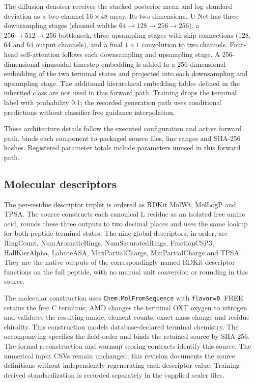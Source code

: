 \documentclass[11pt,a4paper]{article}
\begin{document}
The diffusion denoiser receives the stacked posterior mean and log standard deviation as a two-channel $16\times48$ array. Its two-dimensional U-Net has three downsampling stages (channel widths $64\rightarrow128\rightarrow256\rightarrow256$), a $256\rightarrow512\rightarrow256$ bottleneck, three upsampling stages with skip connections (128, 64 and 64 output channels), and a final $1\times1$ convolution to two channels. Four-head self-attention follows each downsampling and upsampling stage. A 256-dimensional sinusoidal timestep embedding is added to a 256-dimensional embedding of the two terminal states and projected into each downsampling and upsampling stage. The additional hierarchical embedding tables defined in the inherited class are not used in this forward path. Training drops the terminal label with probability 0.1; the recorded generation path uses conditional predictions without classifier-free guidance interpolation.

These architecture details follow the executed configuration and active forward path.  binds each component to packaged source files, line ranges and SHA-256 hashes. Registered parameter totals include parameters unused in this forward path.

\subsection*{Molecular descriptors}
The per-residue descriptor triplet is ordered as RDKit MolWt, MolLogP and TPSA. The source constructs each canonical L residue as an isolated free amino acid, rounds these three outputs to two decimal places and uses the same lookup for both peptide terminal states. The nine global descriptors, in order, are RingCount, NumAromaticRings, NumSaturatedRings, FractionCSP3, HallKierAlpha, LabuteASA, MaxPartialCharge, MinPartialCharge and TPSA. They are the native outputs of the correspondingly named RDKit descriptor functions on the full peptide, with no manual unit conversion or rounding in this source.

The molecular construction uses \texttt{Chem.MolFromSequence} with \texttt{flavor=0}. FREE retains the free C terminus; AMD changes the terminal OXT oxygen to nitrogen and validates the resulting amide, element counts, exact-mass change and residue chirality. This construction models database-declared terminal chemistry. The accompanying  specifies the field order and binds the retained source by SHA-256. The formal reconstruction and warmup scoring contracts identify this source. The numerical input CSVs remain unchanged; this revision documents the source definitions without independently regenerating each descriptor value. Training-derived standardization is recorded separately in the supplied scaler files.
\end{document}
